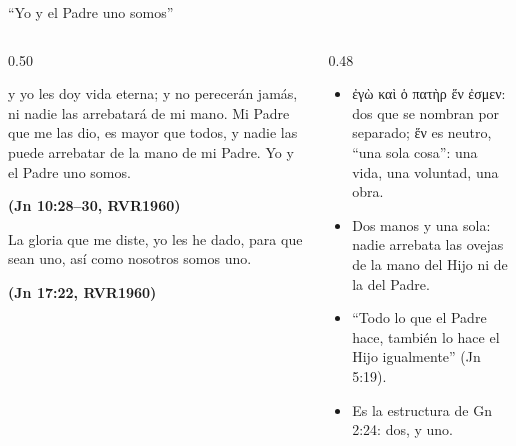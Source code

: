 \documentclass[hyperref={bookmarks=false},aspectratio=169]{beamer}
\newcommand{\grc}[1]{\foreignlanguage{ancientgreek}{#1}}
\newcommand{\fuente}[1]{\par\hfill{\upshape\bfseries\footnotesize\textcolor{azul}{#1}}}
\begin{document}
\begin{frame}{``Yo y el Padre uno somos''}
\begin{columns}[t,onlytextwidth]
\begin{column}{0.50\textwidth}
\begin{cita}[fontupper=\scriptsize\itshape]y yo les doy vida eterna; y no perecerán jamás, ni nadie las arrebatará de mi mano. Mi Padre que me las dio, es mayor que todos, y nadie las puede arrebatar de la mano de mi Padre. Yo y el Padre uno somos.\fuente{(Jn 10:28--30, RVR1960)}\end{cita}
\begin{cita}[fontupper=\scriptsize\itshape]La gloria que me diste, yo les he dado, para que sean uno, así como nosotros somos uno.\fuente{(Jn 17:22, RVR1960)}\end{cita}
\end{column}
\begin{column}{0.48\textwidth}\small
\begin{itemize}
\item \grc{ἐγὼ καὶ ὁ πατὴρ ἕν ἐσμεν}: dos que se nombran por separado; \grc{ἕν} es neutro, ``una sola cosa'': una vida, una voluntad, una obra.
\item Dos manos y una sola: nadie arrebata las ovejas de la mano del Hijo ni de la del Padre.
\item ``Todo lo que el Padre hace, también lo hace el Hijo igualmente'' (Jn 5:19).
\item Es la estructura de Gn 2:24: dos, y uno.
\end{itemize}
\end{column}
\end{columns}
\end{frame}
\end{document}
